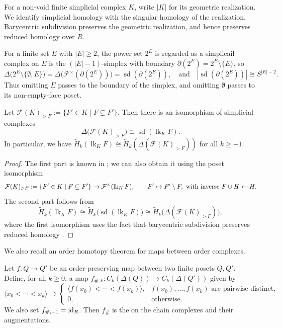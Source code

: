 \documentclass[a4paper,leqno]{amsart}
\begin{document}
For a non-void finite simplicial complex $K$, write $|K|$ for its geometric realization.  We identify simplicial homology with the singular homology of the realization.  Barycentric subdivision preserves the geometric realization, and hence preserves reduced homology over $R$.

For a finite set $E$ with $|E|\geq2$, the power set $2^E$ is regarded as a simplicail complex on $E$ is the $(|E|-1)$-simplex with boundary $\partial(2^E)=2^E\setminus\{E\}$, so
\begin{equation}
\Delta\bigl(2^E\setminus\{\emptyset,E\}\bigr)
=\Delta\bigl(\mathcal F^\times(\partial(2^E))\bigr)
=\operatorname{sd}(\partial(2^E)),\quad \text{and}\quad 
|\operatorname{sd}(\partial(2^E))|\cong S^{|E|-2}.
\label{eq:boolean-boundary-sphere}
\end{equation}
Thus omitting $E$ passes to the boundary of the simplex, and omitting $\emptyset$ passes to its non-empty-face poset.

\begin{lem}\label{lem:munkres}
Let $\mathcal F(K)_{>F}:=\{F'\in K\mid F\subsetneq F'\}$.  Then there is an isomorphism of simplicial complexes
\[
\Delta\bigl(\mathcal F(K)_{>F}\bigr)
\cong\operatorname{sd}(\operatorname{lk}_K F).
\]
In particular, we have $\widetilde{H}_k(\operatorname{lk}_KF)\cong \widetilde{H}_k(\Delta(\mathcal{F}(K)_{>F}))$ for all $k\ge -1$.
\end{lem}
\begin{proof}
The first part is known in \cite[Lemma 15.3]{Mun84}; we can also obtain it using the poset isomorphism
\newcommand{\mapsfrom}{\mathrel{\reflectbox{$\mapsto$}}}
\[
\mathcal F(K)_{>F}:=\{F'\in K\mid F\subsetneq F'\} \rightarrow
\mathcal{F}^\times(\operatorname{lk}_K F),
\qquad F'\mapsto F'\setminus F, \text{ with inverse } F\cup H \mapsfrom  H.
\]
The second part follows from
\[
\widetilde{H}_k(\operatorname{lk}_KF)\cong \widetilde{H}_k\big(\operatorname{sd}(\operatorname{lk}_KF)\big) \cong \widetilde{H}_k\big(\Delta(\mathcal{F}(K)_{>F})\big),
\]
where the first isomorphism uses the fact that barycentric subdivision preserves reduced homology \cite[Theorem 17.2]{Mun84}.
\end{proof}

We also recall an order homotopy theorem for maps between order complexes.

Let $f:Q\to Q'$ be an order-preserving map between two finite posets $Q,Q'$.  Define, for all $k\ge 0$, a map $f_{\#,k}:C_k(\Delta(Q))\to C_k(\Delta(Q'))$ given by
\begin{equation}\label{eq:order-presv-map-induced-chain-map}
\langle x_0<\cdots<x_k\rangle \mapsto
\begin{cases}
\langle f(x_0)<\cdots<f(x_k)\rangle, & f(x_0),\ldots,f(x_k)\text{ are pairwise distinct},\\
0,&\text{otherwise}.
\end{cases}
\end{equation}
We also set $f_{\#,-1}=\operatorname{id}_R$. Then $f_\#$ is the  on the chain complexes and their augmentations.
\end{document}
